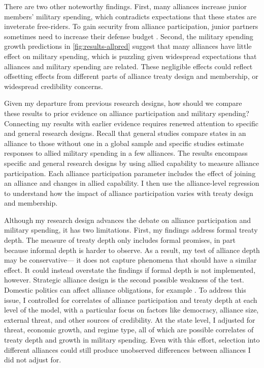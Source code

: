 \documentclass[12pt]{article}
\begin{document}
There are two other noteworthy findings.  
First, many alliances increase junior members' military spending, which contradicts expectations that these states are inveterate free-riders. 
To gain security from alliance participation, junior partners sometimes need to increase their defense budget \citep{Horowitzetal2017}. 
Second, the military spending growth predictions in \autoref{fig:results-allpred} suggest that many alliances have little effect on military spending, which is puzzling given widespread expectations that alliances and military spending are related. 
These negligible effects could reflect offsetting effects from different parts of alliance treaty design and membership, or widespread credibility concerns. 


Given my departure from previous research designs, how should we compare these results to prior evidence on alliance participation and military spending? 
Connecting my results with earlier evidence requires renewed attention to specific and general research designs. 
Recall that general studies compare states in an alliance to those without one in a global sample and specific studies estimate responses to allied military spending in a few alliances. 
The results encompass specific and general research designs by using allied capability to measure alliance participation. 
Each alliance participation parameter includes the effect of joining an alliance and changes in allied capability. 
I then use the alliance-level regression to understand how the impact of alliance participation varies with treaty design and membership.   


Although my research design advances the debate on alliance participation and military spending, it has two limitations. 
First, my findings address formal treaty depth. 
The measure of treaty depth only includes formal promises, in part because informal depth is harder to observe. 
As a result, my test of alliance depth may be conservative--- it does not capture phenomena that should have a similar effect. 
It could instead overstate the findings if formal depth is not implemented, however. 
Strategic alliance design is the second possible weakness of the test. 
Domestic politics can affect alliance obligations, for example \citep{Davis2004, Chibaetal2015}.   
To address this issue, I controlled for correlates of alliance participation and treaty depth at each level of the model, with a particular focus on factors like democracy, alliance size, external threat, and other sources of credibility.
At the state level, I adjusted for threat, economic growth, and regime type, all of which are possible correlates of treaty depth and growth in military spending. 
Even with this effort, selection into different alliances could still produce unobserved differences between alliances I did not adjust for. 
\end{document}

